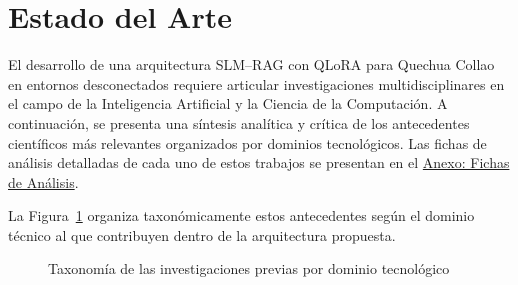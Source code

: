 \newpage
\section[Estado del arte]{Estado del Arte}

El desarrollo de una arquitectura SLM--RAG con QLoRA para Quechua Collao en entornos desconectados requiere articular investigaciones multidisciplinares en el campo de la Inteligencia Artificial y la Ciencia de la Computación. A continuación, se presenta una síntesis analítica y crítica de los antecedentes científicos más relevantes organizados por dominios tecnológicos. Las fichas de análisis detalladas de cada uno de estos trabajos se presentan en el \hyperref[sec:anexos]{Anexo: Fichas de Análisis}.

La Figura~\ref{fig:taxonomia_estado_arte} organiza taxonómicamente estos antecedentes según el dominio técnico al que contribuyen dentro de la arquitectura propuesta.

\begin{figure}[H]
\centering
{}
\caption{Taxonomía de las investigaciones previas por dominio tecnológico}
\label{fig:taxonomia_estado_arte}
\end{figure}

